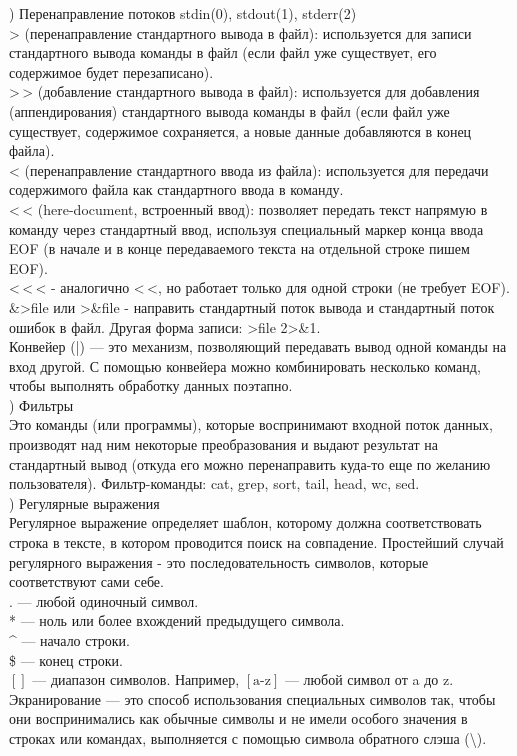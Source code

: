 ) Перенаправление потоков stdin(0), stdout(1), stderr(2) \\
> (перенаправление стандартного вывода в файл): используется для записи стандартного вывода команды в файл (если файл уже существует, его содержимое будет перезаписано). \\
>\,> (добавление стандартного вывода в файл):
используется для добавления (аппендирования) стандартного вывода команды в файл (если файл уже существует, содержимое сохраняется, а новые данные добавляются в конец файла). \\
< (перенаправление стандартного ввода из файла): используется для передачи содержимого файла как стандартного ввода в команду. \\
<\,< (here-document, встроенный ввод): позволяет передать текст напрямую в команду через стандартный ввод, используя специальный маркер конца ввода EOF (в начале и в конце передаваемого текста на отдельной строке пишем EOF). \\
<\,<\,< - аналогично <\,<, но работает только для одной строки (не требует EOF). \\
\&>file или >\&file - направить стандартный поток вывода и стандартный поток ошибок в файл. Другая форма записи: >file 2>\&1. \\
Конвейер (|) — это механизм, позволяющий передавать вывод одной команды на вход другой. С помощью конвейера
можно комбинировать несколько команд, чтобы выполнять обработку данных поэтапно. \\

) Фильтры \\
Это команды (или программы), которые воспринимают входной поток данных, производят над ним некоторые преобразования и выдают результат на стандартный вывод (откуда его можно перенаправить куда-то еще по желанию пользователя). Фильтр-команды: cat, grep, sort, tail, head, wc, sed. \\

) Регулярные выражения \\
Регулярное выражение определяет шаблон, которому должна соответствовать строка в тексте, в котором проводится поиск на совпадение. Простейший случай регулярного выражения - это последовательность символов, которые соответствуют сами себе. \\
. — любой одиночный символ. \\
* — ноль или более вхождений предыдущего символа. \\
\^{} — начало строки. \\
\$ — конец строки. \\
$[]$ — диапазон символов. Например, $[\text{a-z}]$ — любой символ от a до z. \\
Экранирование — это способ использования специальных символов так, чтобы они воспринимались как обычные символы и не имели особого значения в строках или командах, выполняется с помощью символа обратного слэша (\textbackslash). \\

